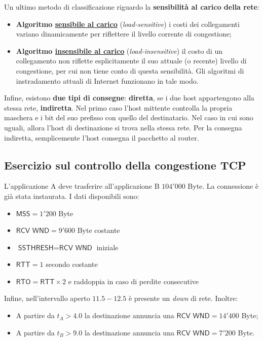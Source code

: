 \documentclass[a4paper]{article}
\begin{document}
	\noindent
	Un ultimo metodo di classificazione riguardo la \textbf{sensibilità al carico della rete}:
	\begin{itemize}
		\item \textbf{Algoritmo \underline{sensibile al carico}} (\emph{load-sensitive}) i costi dei collegamenti variano dinamicamente per riflettere il livello corrente di congestione;
		
		\item \textbf{Algoritmo \underline{insensibile al carico}} (\emph{load-insensitive}) il costo di un collegamento non riflette esplicitamente il suo attuale (o recente) livello di congestione, per cui non tiene conto di questa sensibilità. Gli algoritmi di instradamento attuali di Internet funzionano in tale modo.
	\end{itemize}
	Infine, esistono \textbf{due tipi di consegne}: \textbf{diretta}, se i due host appartengono alla stessa rete, \textbf{indiretta}. Nel primo caso l'host mittente controlla la propria maschera e i bit del suo prefisso con quello del destinatario. Nel caso in cui sono uguali, allora l'host di destinazione si trova nella stessa rete. Per la consegna indiretta, semplicemente l'host consegna il pacchetto al router.\newpage
	
	\subsection{\textcolor{Red3}{Esercizio sul controllo della congestione TCP}}
	
	L’applicazione A deve trasferire all'applicazione B $104'000$ Byte. La connessione è già stata instaurata. I dati disponibili sono:
	\begin{itemize}
		\item $\textsf{MSS} = 1'200$ Byte
		\item $\textsf{RCV WND} = 9'600$ Byte costante
		\item $\textsf{SSTHRESH} = \textsf{RCV WND}$ iniziale
		\item $\textsf{RTT} = 1$ secondo costante
		\item $\textsf{RTO} = \textsf{RTT} \times 2$ e raddoppia in caso di perdite consecutive
	\end{itemize}
	Infine, nell'intervallo aperto $11.5 - 12.5$ è presente un \emph{down} di rete. Inoltre:
	\begin{itemize}
		\item A partire da $t_{A} > 4.0$ la destinazione annuncia una $\textsf{RCV WND} = 14'400$ Byte;
		\item A partire da $t_{B} > 9.0$ la destinazione annuncia una $\textsf{RCV WND} =  7'200$ Byte.
	\end{itemize}
	
\end{document}
